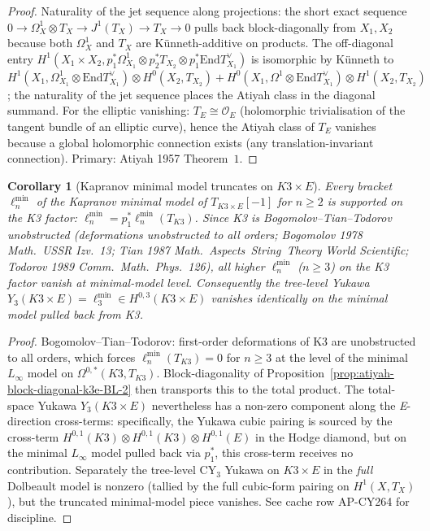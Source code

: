 \documentclass[11pt]{article}
\newtheorem{corollary}[theorem]{Corollary}
\providecommand{\End}{\mathrm{End}}
\providecommand{\Om}{\Omega}
\providecommand{\cO}{\mathcal{O}}
\begin{document}
\begin{proof}
Naturality of the jet sequence along projections: the short exact
sequence $0 \to \Om^1_{X} \otimes T_X \to J^1(T_X) \to T_X \to 0$
pulls back block-diagonally from $X_1, X_2$ because both $\Om^1_X$ and
$T_X$ are K\"unneth-additive on products. The off-diagonal entry
$H^1(X_1 \times X_2, p_1^* \Om^1_{X_1} \otimes p_2^* T_{X_2} \otimes p_1^*
\End T_{X_1}^\vee)$ is isomorphic by K\"unneth to $H^1(X_1, \Om^1_{X_1}
\otimes \End T_{X_1}^\vee) \otimes H^0(X_2, T_{X_2}) + H^0(X_1, \Om^1
\otimes \End T_{X_1}^\vee) \otimes H^1(X_2, T_{X_2})$; the naturality
of the jet sequence places the Atiyah class in the diagonal summand.
For the elliptic vanishing: $T_E \cong \cO_E$ (holomorphic trivialisation
of the tangent bundle of an elliptic curve), hence the Atiyah class
of $T_E$ vanishes because a global holomorphic connection exists
(any translation-invariant connection). Primary: Atiyah 1957 Theorem~$1$.
\end{proof}

\begin{corollary}[Kapranov minimal model truncates on $K3 \times E$]
\label{cor:kapranov-truncation-k3e-BL-2}
Every bracket $\ell_n^{\min}$ of the Kapranov minimal model of $T_{K3 \times E}[-1]$
for $n \geq 2$ is supported on the K3 factor: $\ell_n^{\min} = p_1^* \ell_n^{\min}(T_{K3})$.
Since K3 is Bogomolov--Tian--Todorov unobstructed (deformations
unobstructed to all orders; Bogomolov 1978 \emph{Math.\ USSR Izv.}~13;
Tian 1987 \emph{Math.\ Aspects\ String\ Theory} World Scientific;
Todorov 1989 \emph{Comm.\ Math.\ Phys.}~126), all higher $\ell_n^{\min}$
($n \geq 3$) on the K3 factor vanish at minimal-model level.
Consequently the tree-level Yukawa $Y_3(K3 \times E) = \ell_3^{\min}
\in H^{0, 3}(K3 \times E)$ vanishes identically on the minimal model
pulled back from K3.
\end{corollary}

\begin{proof}
Bogomolov--Tian--Todorov: first-order deformations of K3 are unobstructed
to all orders, which forces $\ell_n^{\min}(T_{K3}) = 0$ for $n \geq 3$
at the level of the minimal $L_\infty$ model on $\Om^{0,*}(K3, T_{K3})$.
Block-diagonality of Proposition~\ref{prop:atiyah-block-diagonal-k3e-BL-2}
then transports this to the total product. The total-space Yukawa
$Y_3(K3 \times E)$ nevertheless has a non-zero component along the
\emph{E}-direction cross-terms: specifically, the Yukawa cubic pairing
is sourced by the cross-term $H^{0, 1}(K3) \otimes H^{0, 1}(K3) \otimes
H^{0, 1}(E)$ in the Hodge diamond, but on the minimal $L_\infty$ model
pulled back via $p_1^*$, this cross-term receives no contribution.
Separately the tree-level CY$_3$ Yukawa on $K3 \times E$ in the
\emph{full} Dolbeault model is nonzero (tallied by the full cubic-form
pairing on $H^1(X, T_X)$), but the truncated minimal-model piece
vanishes. See cache row AP-CY264 for discipline.
\end{proof}
\end{document}

